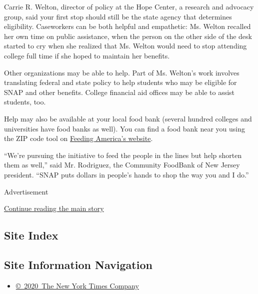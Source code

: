 Carrie R. Welton, director of policy at the Hope Center, a research and
advocacy group, said your first stop should still be the state agency
that determines eligibility. Caseworkers can be both helpful and
empathetic: Ms. Welton recalled her own time on public assistance, when
the person on the other side of the desk started to cry when she
realized that Ms. Welton would need to stop attending college full time
if she hoped to maintain her benefits.

Other organizations may be able to help. Part of Ms. Welton's work
involves translating federal and state policy to help students who may
be eligible for SNAP and other benefits. College financial aid offices
may be able to assist students, too.

Help may also be available at your local food bank (several hundred
colleges and universities have food banks as well). You can find a food
bank near you using the ZIP code tool on
\href{https://www.feedingamerica.org/find-your-local-foodbank}{Feeding
America's website}.

``We're pursuing the initiative to feed the people in the lines but help
shorten them as well,'' said Mr. Rodriguez, the Community FoodBank of
New Jersey president. ``SNAP puts dollars in people's hands to shop the
way you and I do.''

Advertisement

\protect\hyperlink{after-bottom}{Continue reading the main story}

\hypertarget{site-index}{%
\subsection{Site Index}\label{site-index}}

\hypertarget{site-information-navigation}{%
\subsection{Site Information
Navigation}\label{site-information-navigation}}

\begin{itemize}
\tightlist
\item
  \href{https://help.nytimes3xbfgragh.onion/hc/en-us/articles/115014792127-Copyright-notice}{©~2020~The
  New York Times Company}
\end{itemize}

